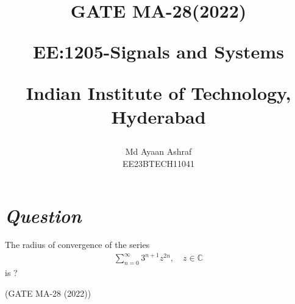 \documentclass[journal,12pt,twocolumn]{IEEEtran}
\theoremstyle{remark}
\begin{document}
%




\vspace{3cm}

\title{
GATE MA-28(2022) 

\large{EE:1205-Signals and Systems}

Indian Institute of Technology, Hyderabad
}
\author{Md Ayaan Ashraf

EE23BTECH11041
}	

\maketitle

\newpage


\bigskip
\renewcommand{\thefigure}{\arabic{figure}}
\renewcommand{\thetable}{\arabic{table}}
\section*{\textit{\textbf{Question}}}
The radius of convergence of the series
\begin{align}
    \sum_{n=0}^{\infty} 3^{n+1}z^{2n}, \quad z \in \mathbb{C} \nonumber{}
\end{align}is ?

\hfill {(GATE MA-28 (2022))}
\end{document}
